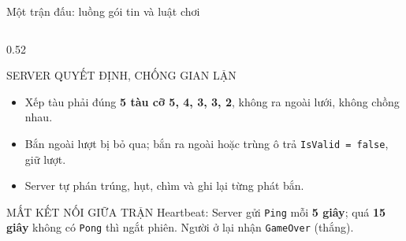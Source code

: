 \documentclass[aspectratio=169,9pt]{beamer}
\newenvironment{haicot}[1]{\begin{columns}[T,onlytextwidth]\begin{column}{#1\textwidth}}{\end{column}\end{columns}}
\begin{document}
\begin{frame}[t,label=game]{Một trận đấu: luồng gói tin và luật chơi}
\begin{haicot}{0.52}
\begin{khung}{SERVER QUYẾT ĐỊNH, CHỐNG GIAN LẬN}
      \begin{itemize}\setlength{\itemsep}{1pt}
        \item Xếp tàu phải đúng \textbf{5 tàu cỡ 5, 4, 3, 3, 2}, không ra ngoài lưới, không chồng nhau.
        \item Bắn ngoài lượt bị bỏ qua; bắn ra ngoài hoặc trùng ô trả \texttt{IsValid = false}, giữ lượt.
        \item Server tự phán trúng, hụt, chìm và ghi lại từng phát bắn.
      \end{itemize}
    \end{khung}
    \begin{khung}{MẤT KẾT NỐI GIỮA TRẬN}
      Heartbeat: Server gửi \texttt{Ping} mỗi \textbf{5 giây}; quá \textbf{15 giây} không có \texttt{Pong} thì ngắt phiên. Người ở lại nhận \texttt{GameOver} (thắng).
    \end{khung}
  \end{haicot}
\end{frame}
\end{document}
